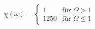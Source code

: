 \documentclass{article}
\begin{document}
\begin{equation}
\chi(\omega) = \begin{cases}
1 & \text{für \(\Omega > 1 \)}\\
1250 &\text{für \(\Omega \leq 1 \)}
\end{cases}
\end{equation}
\end{document}
